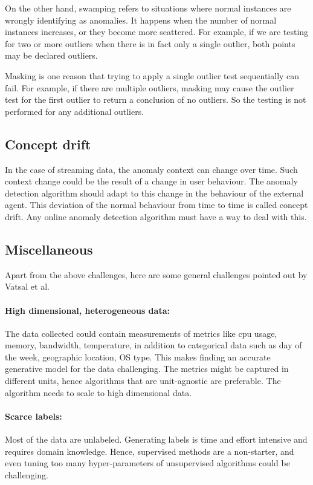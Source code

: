 On the other hand, swamping refers to situations where normal instances are wrongly identifying as anomalies.
It happens when the number of normal instances increases, or they become more scattered.
For example, if we are testing for two or more outliers when there is in fact only a single outlier, both points may be declared outliers.

Masking is one reason that trying to apply a single outlier test sequentially can fail.
For example, if there are multiple outliers, masking may cause the outlier test for the first outlier to return a conclusion of no outliers.
So the testing is not performed for any additional outliers.

\subsection{Concept drift}
\label{subsec:concept-drift}

In the case of streaming data, the anomaly context can change over time.
Such context change could be the result of a change in user behaviour.
The anomaly detection algorithm should adapt to this change in the behaviour of the external agent.
This deviation of the normal behaviour from time to time is called concept drift.
Any online anomaly detection algorithm must have a way to deal with this.

\subsection{Miscellaneous}
\label{subsec:misc-challenges}

Apart from the above challenges, here are some general challenges pointed out by Vatsal et al. \cite{NIPS2019_9710}

\paragraph{High dimensional, heterogeneous data:}
The data collected could contain measurements of metrics like cpu usage, memory, bandwidth, temperature, in addition to categorical data such as day of the week, geographic location, OS type. 
This makes finding an accurate generative model for the data challenging. 
The metrics might be captured in different units, hence algorithms that are unit-agnostic are preferable. 
The algorithm needs to scale to high dimensional data.

\paragraph{Scarce labels:} Most of the data are unlabeled.
Generating labels is time and effort intensive and requires domain knowledge.
Hence, supervised methods are a non-starter, and even tuning too many hyper-parameters of unsupervised algorithms could be challenging.

